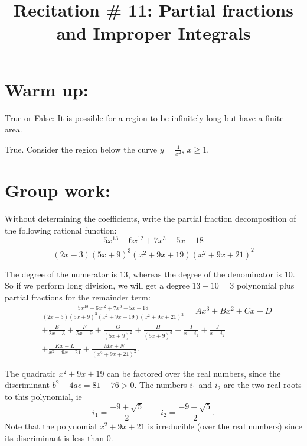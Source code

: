 \documentclass[handout]{ximera}
\title{Recitation \# 11: Partial fractions and Improper Integrals}
\begin{document}
\begin{abstract}		\end{abstract}
\maketitle




\section{Warm up:}
True or False:  It is possible for a region to be infinitely long but have a finite area.
	\begin{freeResponse}
	True.  Consider the region below the curve $y=\frac{1}{x^2}$, $x \geq 1$.
	\end{freeResponse}
	
\begin{instructorNotes}

\end{instructorNotes}







\section{Group work:}



\begin{problem}
Without determining the coefficients, write the partial fraction decomposition of the following rational function:
	\[
	\frac{5x^{13} - 6x^{12} + 7x^3 - 5x - 18}{(2x-3)(5x+9)^3 (x^2+9x+19)(x^2+9x+21)^2}
	\]
	\begin{freeResponse}
	The degree of the numerator is $13$, whereas the degree of the denominator is $10$.  
	So if we perform long division, we will get a degree $13-10=3$ polynomial plus partial fractions for the remainder term:
		\begin{align*}
		&\frac{5x^{13} - 6x^{12} + 7x^3 - 5x - 18}{(2x-3)(5x+9)^3 (x^2+9x+19)(x^2+9x+21)^2} = Ax^3 + Bx^2 + Cx + D  \\
		&+ \frac{E}{2x-3} + \frac{F}{5x+9} + \frac{G}{(5x+9)^2} + \frac{H}{(5x+9)^3} + \frac{I}{x-i_1} + \frac{J}{x-i_2}  \\
		&+ \frac{Kx+L}{x^2+9x+21} + \frac{Mx+N}{(x^2+9x+21)^2}.
		\end{align*}
		
	The quadratic $x^2+9x+19$ can be factored over the real numbers, since the discriminant $b^2-4ac = 81-76 > 0$.  
	The numbers $i_1$ and $i_2$ are the two real roots to this polynomial, ie
		\[
		i_1 = \frac{-9+\sqrt{5}}{2}	\qquad	i_2=\frac{-9 - \sqrt{5}}{2}.
		\]
	Note that the polynomial $x^2+9x+21$ is irreducible (over the real numbers) since its discriminant is less than $0$.  
	\end{freeResponse}
	
\end{problem}
\end{document}
